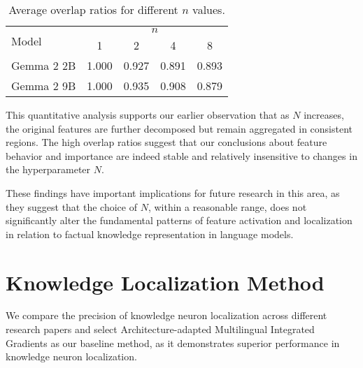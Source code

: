 \begin{table*}[htbp]
\centering
\begin{tabular}{@{}lcccc@{}}
\toprule
\multirow{2}{*}{Model} & \multicolumn{4}{c}{$n$} \\
\cmidrule(l){2-5}
& 1 & 2 & 4 & 8 \\
\midrule
Gemma 2 2B    & 1.000 & 0.927 & 0.891 & 0.893 \\
Gemma 2 9B & 1.000 & 0.935 & 0.908 & 0.879 \\
\bottomrule
\end{tabular}
\caption{Average overlap ratios for different $n$ values.}
\label{appendix: tab:feature-stability}
\end{table*}
This quantitative analysis supports our earlier observation that as $N$ increases, the original features are further decomposed but remain aggregated in consistent regions. The high overlap ratios suggest that our conclusions about feature behavior and importance are indeed stable and relatively insensitive to changes in the hyperparameter $N$.

These findings have important implications for future research in this area, as they suggest that the choice of $N$, within a reasonable range, does not significantly alter the fundamental patterns of feature activation and localization in relation to factual knowledge representation in language models.

\section{Knowledge Localization Method}

\label{appendix:section:Knowledge Localization Method}
We compare the precision of knowledge neuron localization across different research papers and select Architecture-adapted Multilingual Integrated Gradients \citep{chen2024journey} as our baseline method, as it demonstrates superior performance in knowledge neuron localization.

